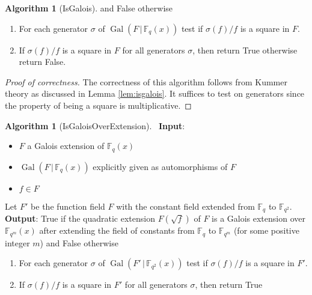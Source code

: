 \documentclass{dcthesis}
\newcommand{\FF}{\mathbb{F}}
\DeclareMathOperator{\Gal}{Gal}
\numberwithin{equation}{section}
\theoremstyle{definition}
\newtheorem{alg}[equation]{Algorithm}
\theoremstyle{remark}
\begin{document}
{{{\begin{alg}[IsGalois]
      and \textsf{False} otherwise
      \begin{enumerate}
        \item
          For each generator
          $\sigma$ of $\Gal(F\,|\,\FF_q(x))$
          test if $\sigma(f)/f$ is a square
          in $F$.
        \item
          If $\sigma(f)/f$ is a square in $F$
          for all generators $\sigma$,
          then return \textsf{True}
          otherwise return \textsf{False}.
      \end{enumerate}
    \end{alg}
    \begin{proof}[Proof of correctness]
      The correctness of this algorithm
      follows from Kummer theory
      as discussed in
      Lemma \ref{lem:isgalois}.
      It suffices to test on generators
      since the property of being a square
      is multiplicative.
    \end{proof}
    \begin{alg}[IsGaloisOverExtension]
      \label{alg:isgaloisoverextension}
      \,
      \newline
      \textbf{Input}:
      \begin{itemize}
        \item
          $F$ a Galois extension of
          $\FF_q(x)$
        \item
          $\Gal(F\,|\,\FF_q(x))$
          explicitly given
          as automorphisms of $F$
        \item
          $f\in F$
      \end{itemize}
      Let $F'$ be the function field $F$
      with the constant field
      extended
      from $\FF_q$ to $\FF_{q^2}$.
      \textbf{Output}:
      \textsf{True} if the quadratic extension
      $F(\sqrt{f})$ of $F$
      is a Galois extension over $\FF_{q^m}(x)$
      after extending the field of constants
      from $\FF_q$ to $\FF_{q^m}$
      (for some positive integer $m$)
      and \textsf{False} otherwise
      \begin{enumerate}
        \item
          For each generator
          $\sigma$ of $\Gal(F'\,|\,\FF_{q^2}(x))$
          test if $\sigma(f)/f$ is a square
          in $F'$.
        \item
          If $\sigma(f)/f$ is a square in $F'$
          for all generators $\sigma$,
          then return \textsf{True}

\end{enumerate}
\end{alg}}}}
\end{document}
